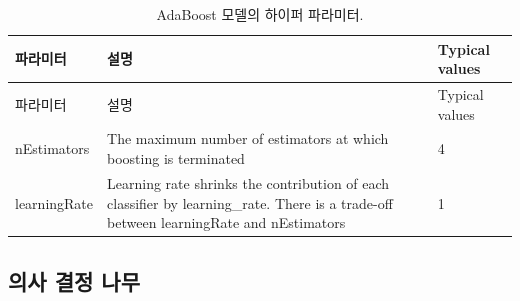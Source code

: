\documentclass[10.5pt]{book}
\theoremstyle{definition}
\theoremstyle{definition}
\theoremstyle{definition}
\theoremstyle{remark}
\begin{document}
\begin{longtable}[]{@{}lll@{}}
\caption{\label{tab:adaBoostParameters} AdaBoost 모델의 하이퍼
파라미터.}\tabularnewline
\toprule
\begin{minipage}[b]{0.13\columnwidth}\raggedright\strut
파라미터\strut
\end{minipage} & \begin{minipage}[b]{0.16\columnwidth}\raggedright\strut
설명\strut
\end{minipage} & \begin{minipage}[b]{0.20\columnwidth}\raggedright\strut
Typical values\strut
\end{minipage}\tabularnewline
\midrule
\endfirsthead
\toprule
\begin{minipage}[b]{0.13\columnwidth}\raggedright\strut
파라미터\strut
\end{minipage} & \begin{minipage}[b]{0.16\columnwidth}\raggedright\strut
설명\strut
\end{minipage} & \begin{minipage}[b]{0.20\columnwidth}\raggedright\strut
Typical values\strut
\end{minipage}\tabularnewline
\midrule
\endhead
\begin{minipage}[t]{0.13\columnwidth}\raggedright\strut
nEstimators\strut
\end{minipage} & \begin{minipage}[t]{0.16\columnwidth}\raggedright\strut
The maximum number of estimators at which boosting is terminated\strut
\end{minipage} & \begin{minipage}[t]{0.20\columnwidth}\raggedright\strut
4\strut
\end{minipage}\tabularnewline
\begin{minipage}[t]{0.13\columnwidth}\raggedright\strut
learningRate\strut
\end{minipage} & \begin{minipage}[t]{0.16\columnwidth}\raggedright\strut
Learning rate shrinks the contribution of each classifier by
learning\_rate. There is a trade-off between learningRate and
nEstimators\strut
\end{minipage} & \begin{minipage}[t]{0.20\columnwidth}\raggedright\strut
1\strut
\end{minipage}\tabularnewline
\bottomrule
\end{longtable}

\subsection{의사 결정 나무}\label{--}
\end{document}
